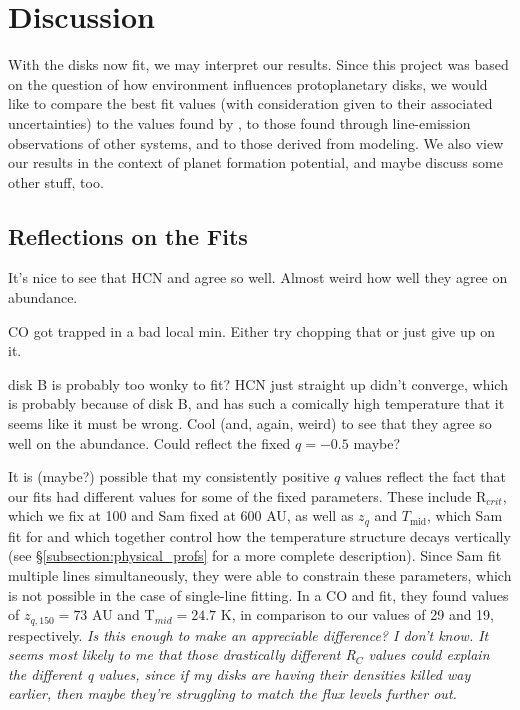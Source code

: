 \chapter{Discussion}
\label{chap:discussion}

With the disks now fit, we may interpret our results. Since this project was based on the question of how environment influences protoplanetary disks, we would like to compare the best fit values (with consideration given to their associated uncertainties) to the values found by \citet{Factor2017}, to those found through line-emission observations of other systems, and to those derived from modeling. We also view our results in the context of planet formation potential, and maybe discuss some other stuff, too.


\section{Reflections on the Fits}

It's nice to see that HCN and \hco agree so well. Almost weird how well they agree on abundance.

CO got trapped in a bad local min. Either try chopping that or just give up on it.

disk B is probably too wonky to fit? HCN just straight up didn't converge, which is probably because of disk B, and \hco has such a comically high temperature that it seems like it must be wrong. Cool (and, again, weird) to see that they agree so well on the abundance. Could reflect the fixed $q = -0.5$ maybe?



It is (maybe?) possible that my consistently positive $q$ values reflect the fact that our fits had different values for some of the fixed parameters. These include R$_{crit}$, which we fix at 100 and Sam fixed at 600 AU, as well as $z_q$ and $T_\text{mid}$, which Sam fit for and which together control how the temperature structure decays vertically (see \S\ref{subsection:physical_profs} for a more complete description). Since Sam fit multiple lines simultaneously, they were able to constrain these parameters, which is not possible in the case of single-line fitting. In a CO and \hco fit, they found values of $z_{q, 150} = 73$ AU and T$_{mid} = 24.7$ K, in comparison to our values of 29 and 19, respectively. \textit{Is this enough to make an appreciable difference? I don't know. It seems most likely to me that those drastically different R$_C$ values could explain the different q values, since if my disks are having their densities killed way earlier, then maybe they're struggling to match the flux levels further out. }

